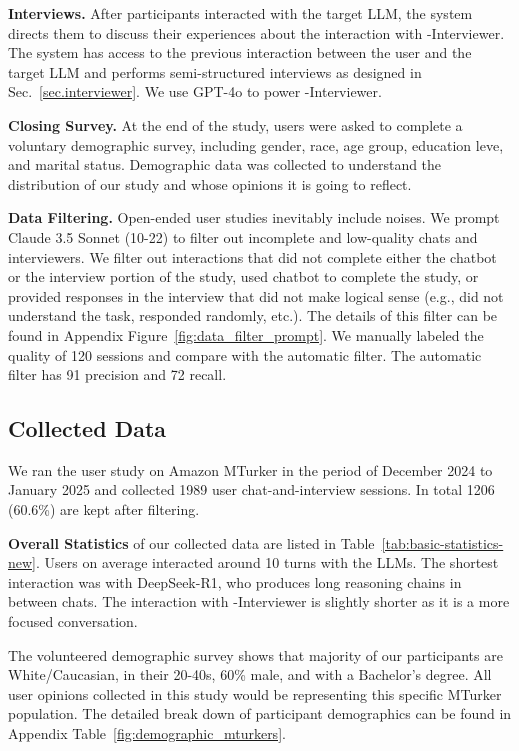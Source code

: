 \textbf{\method{} Interviews.} After participants interacted with the target LLM, the system directs them to discuss their experiences about the interaction with \method-Interviewer. The system has access to the previous interaction between the user and the target LLM and performs semi-structured interviews as designed in Sec.~\ref{sec.interviewer}. We use GPT-4o to power \method-Interviewer.

\textbf{Closing Survey.} At the end of the study, users were asked to complete a voluntary demographic survey, including gender, race, age group, education leve, and marital status. Demographic data was collected to understand the distribution of our study and whose opinions it is going to reflect.

\textbf{Data Filtering.} Open-ended user studies inevitably include noises. We prompt Claude 3.5 Sonnet (10-22) to filter out incomplete and low-quality chats and interviewers. We filter out interactions that  did not complete either the chatbot or the interview portion of the study, used chatbot to complete the study, or provided responses in the interview that did not make logical sense (e.g., did not understand the task, responded randomly, etc.). The details of this filter can be found in Appendix Figure~\ref{fig:data_filter_prompt}.
We manually labeled the quality of 120 sessions and compare with the automatic filter. The automatic filter has 91 precision and 72 recall.





\subsection{Collected Data}

We ran the user study on Amazon MTurker in the period of December 2024 to January 2025 and collected 1989 user chat-and-interview sessions. In total 1206 (60.6\%) are kept after filtering.

\textbf{Overall Statistics} of our collected data are listed in Table~\ref{tab:basic-statistics-new}. Users on average interacted around 10 turns with the LLMs. The shortest interaction was with DeepSeek-R1, who produces long reasoning chains in between chats. The interaction with \method{}-Interviewer is slightly shorter as it is a more focused conversation.  

The volunteered demographic survey shows that majority of our participants are White/Caucasian, in their 20-40s, 60\% male, and with a Bachelor's degree.
All user opinions collected in this study would be representing this specific MTurker population. The detailed break down of participant demographics can be found in Appendix Table~\ref{fig:demographic_mturkers}.

